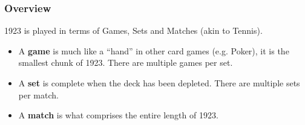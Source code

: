 \documentclass[11pt]{article}
\begin{document}
\subsubsection{Overview}
\label{sec-2-2-1}

1923 is played in terms of Games, Sets and Matches (akin to Tennis).  

\begin{itemize}
\item A \textbf{game} is much like a ``hand'' in other card games (e.g. Poker), it is
  the smallest chunk of 1923. There are multiple games per set.
\item A \textbf{set} is complete when the deck has been depleted. There are
  multiple sets per match.
\item A \textbf{match} is what comprises the entire length of 1923.
\end{itemize}
\end{document}
